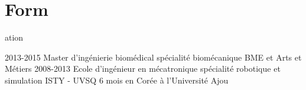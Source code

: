 \documentclass{cv-style}     %
\begin{document}

\section{Form}{ation}

\begin{entrylist}
\entry
{2013-2015}
{Master d'ingénierie biomédical {\normalfont spécialité biomécanique}}
{BME et Arts et Métiers}
{}
\entry
{2008-2013}
{Ecole d'ingénieur en mécatronique {\normalfont spécialité robotique et simulation}}
{ISTY - UVSQ}
{6 mois en Corée à l'Université Ajou}
\end{entrylist}





%

\end{document}
